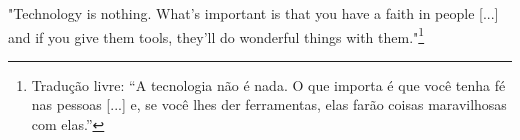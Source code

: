 "Technology is nothing. What's important is that you have a faith in people [...] and if you give them tools, they’ll do wonderful things with them."\footnote{Tradução livre: ``A tecnologia não é nada. O que importa é que você tenha fé nas pessoas [...] e, se você lhes der ferramentas, elas farão coisas maravilhosas com elas.''} \nocite{jobs1994rollingstone}
